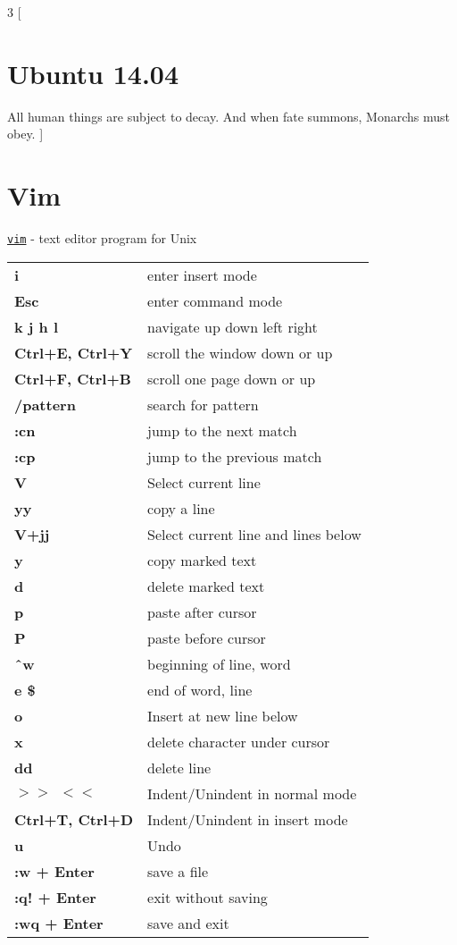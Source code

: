\documentclass[10pt,landscape]{article}
\begin{document}
\begin{multicols}{3}
[
\section*{Ubuntu 14.04}
All human things are subject to decay. And when fate summons, Monarchs must obey.
]

\section*{Vim}
\vspace{-0.7em}
\texttt{\href{https://vim.rtorr.com/}{vim}} - text editor program for Unix \\
\begin{tabular}{l l}
\textbf{i} & enter insert mode\\
\textbf{Esc} & enter command mode \\
\textbf{k j h l } & navigate up down left right\\
\textbf{Ctrl+E, Ctrl+Y} & scroll the window down or up\\ 
\textbf{Ctrl+F, Ctrl+B} & scroll one page down or up\\
\textbf{/pattern} & search for pattern\\
\textbf{:cn} & jump to the next match\\
\textbf{:cp} & jump to the previous match\\
\textbf{V} & Select current line\\
\textbf{yy} & copy a line\\
\textbf{V+jj} & Select current line and lines below\\
\textbf{y} & copy marked text\\
\textbf{d} & delete marked text\\
\textbf{p} & paste after cursor\\
\textbf{P} & paste before cursor\\
\textbf{\^\ w} & beginning of line, word\\
\textbf{e \$} & end of word, line\\
\textbf{o} & Insert at new line below\\
\textbf{x} & delete character under cursor\\
\textbf{dd} & delete line\\
\textbf{$>>\ \ <<$} & Indent/Unindent in normal mode\\
\textbf{Ctrl+T, Ctrl+D} & Indent/Unindent in insert mode\\
\textbf{u} & Undo\\
\textbf{:w + Enter} & save a file\\
\textbf{:q! + Enter} & exit without saving\\
\textbf{:wq + Enter} & save and exit\\
\end{tabular}


\end{multicols}
\end{document}
